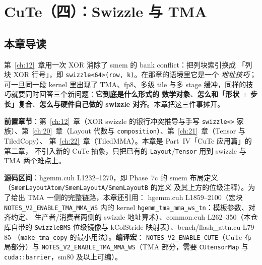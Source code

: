 \makeatletter
\providecommand{\urlchbrk}[1]{\@tfor\next:=#1\do{\next\allowbreak}}
\makeatother
\providecommand{\url}[1]{{\ttfamily\urlchbrk{#1}}}
\chapter{CuTe（四）：Swizzle 与 TMA}\label{ch:23}

\section{本章导读}

第~\ref{ch:12}~章用一次 XOR 消除了 smem 的 bank conflict：把列块索引换成
「列块 XOR 行号」，即 \texttt{swizzle\allowbreak{}<64>\allowbreak{}(row,\allowbreak{} k)}。在那章的语境里它是一个
\emph{地址技巧}；可一旦同一段 kernel 里出现了 TMA、fp8、多级 tile 与多
stage 缓冲，同样的技巧就要同时回答三个新问题：\textbf{它到底是什么形式的
数学对象}、\textbf{怎么和「形状 $+$ 步长」复合}、\textbf{怎么与硬件自己做的
swizzle 对齐}。本章把这三件事摊开。

\textbf{前置章节}：第~\ref{ch:12}~章（XOR swizzle 的银行冲突推导与手写
\texttt{swizzle<>} 家族）、第~\ref{ch:20}~章（Layout 代数与
\texttt{composition}）、第~\ref{ch:21}~章（Tensor 与 TiledCopy）、
第~\ref{ch:22}~章（TiledMMA）。本章是 Part~IV「CuTe 应用篇」的第二章，
不引入新的 CuTe 抽象，只把已有的 \texttt{Layout}/\texttt{Tensor} 用到
swizzle 与 TMA 两个难点上。

\textbf{源码区间}：hgemm.cuh L1232--1270，即 Phase~7c 的 smem 布局定义
（\texttt{Smem\allowbreak{}Layout\allowbreak{}Atom/\allowbreak{}SmemLayoutA/\allowbreak{}SmemLayoutB} 的定义
及其上方的位级注释）。为了给出 TMA 一侧的完整链路，本章还引用：
hgemm.cuh L1859--2100（宏块 \texttt{NOTES\_\allowbreak{}V2\_\allowbreak{}ENABLE\_\allowbreak{}TMA\_\allowbreak{}MMA\_\allowbreak{}WS}
内的 kernel \texttt{hgemm\_\allowbreak{}tma\_\allowbreak{}mma\_\allowbreak{}ws\_\allowbreak{}tn}：模板参数、对齐约定、
生产者/消费者两侧的 swizzle 地址算术）、common.cuh L262--350（本仓库自带的
\texttt{SwizzleBMS} 位级镜像与 kColStride 映射表）、bench/flash\_attn.cu L79--85
（\texttt{make\_\allowbreak{}tma\_\allowbreak{}copy} 的最小用法）。\textbf{编译宏}：
\texttt{NOTES\_\allowbreak{}V2\_\allowbreak{}ENABLE\_\allowbreak{}CUTE}（CuTe 布局部分）与
\texttt{NOTES\_\allowbreak{}V2\_\allowbreak{}ENABLE\_\allowbreak{}TMA\_\allowbreak{}MMA\_\allowbreak{}WS}（TMA 部分，需要
\texttt{CUtensorMap} 与 \texttt{cuda::\allowbreak{}barrier}，sm80 及以上可编）。


